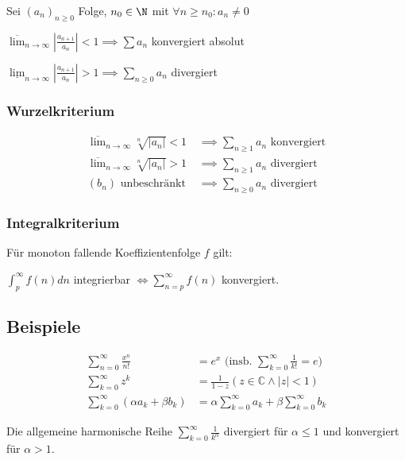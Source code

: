 Sei $(a_n)_{n\geq 0}$ Folge, $n_0 \in \N$ mit $\forall n \geq n_0 : a_n \neq 0$

$\overline\lim_{n \to \infty} |\frac{a_{n+1}}{a_n}| < 1 \implies \sum a_n$ konvergiert absolut

$\underline\lim_{n \to \infty} |\frac{a_{n+1}}{a_n}| > 1 \implies \sum_{n\geq 0} a_n$ divergiert

\subsubsection*{Wurzelkriterium}

\vspace*{-4mm}
\begin{align*}
	\overline\lim_{n \to \infty} \sqrt[n]{|a_n|} < 1 &\implies \textstyle\sum_{n\geq 1} a_n \text{ konvergiert} \\
	\overline\lim_{n \to \infty} \sqrt[n]{|a_n|} > 1 &\implies \textstyle\sum_{n\geq 1} a_n \text{ divergiert} \\
	(b_n) \text{ unbeschränkt } &\implies \textstyle\sum_{n\geq 0} a_n \text{ divergiert}
\end{align*}

\subsubsection*{Integralkriterium}

Für monoton fallende Koeffizientenfolge $f$ gilt:

$\int_p^\infty f(n) dn$ integrierbar $\Leftrightarrow \sum_{n=p}^\infty f(n)$ konvergiert.

\subsection*{Beispiele}

\vspace*{-8mm}
\begin{align*}
	\textstyle\sum_{n=0}^\infty \frac{x^n}{n!} &= e^x \text{ (insb. } \textstyle\sum_{k=0}^{\infty} \frac{1}{k!} = e) \\
	\textstyle\sum_{k=0}^{\infty} z^k &= \frac{1}{1-z} (z \in \mathbb{C} \land |z|<1) \\
	\textstyle\sum_{k=0}^{\infty} (\alpha a_k + \beta b_k) &= \alpha \textstyle\sum_{k=0}^{\infty} a_k + \beta \textstyle\sum_{k=0}^{\infty} b_k
\end{align*}
\vspace*{-4mm}

Die allgemeine harmonische Reihe $\sum_{k=0}^\infty \frac{1}{k^\alpha}$ divergiert für $\alpha \leq 1$ und konvergiert für $\alpha > 1$.

